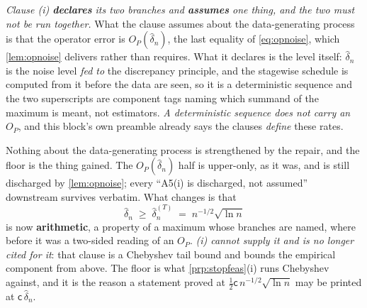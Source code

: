 \emph{Clause \textup{(i)} \textbf{declares} its two branches and \textbf{assumes} one thing, and the
two must not be run together.} What the clause assumes about the data-generating process is that the
operator error is $O_P(\hat\delta_n)$, the last equality of \eqref{eq:opnoise}, which
\cref{lem:opnoise} delivers rather than requires. What it declares is the level itself: $\hat\delta_n$ is
the noise level \emph{fed to} the discrepancy principle, and the stagewise schedule is computed from it
before the data are seen, so it is a deterministic sequence and the two superscripts are component tags
naming which summand of the maximum is meant, not estimators. \emph{A deterministic sequence does not
carry an $O_P$}, and this block's own preamble already says the clauses \emph{define} these rates.

\medskip
\noindent
 Nothing about the data-generating process is strengthened by the repair, and the floor is the
thing gained. The $O_P(\hat\delta_n)$ half is upper-only, as it was, and is still discharged by
\cref{lem:opnoise}; every ``A5(i) is discharged, not assumed'' downstream survives verbatim. What
changes is that
\[
\hat\delta_n\;\ge\;\hat\delta_n^{(T)}\;=\;n^{-1/2}\sqrt{\ln n}
\]
is now \textbf{arithmetic}, a property of a maximum whose branches are named, where before it was a
two-sided reading of an $O_P$. \emph{\textup{(i)} cannot supply it and is no longer
cited for it}: that clause is a Chebyshev tail bound and bounds the empirical component from above.
The floor is what \cref{prp:stopfeas}\textup{(i)} runs Chebyshev against, and it is the reason a
statement proved at $\tfrac12\mathsf c\,n^{-1/2}\sqrt{\ln n}$ may be printed at $\mathsf c\,\hat\delta_n$.

